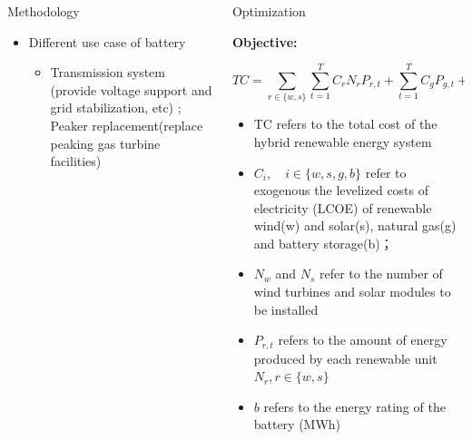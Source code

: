 \documentclass[final]{beamer}
\newlength{\onecolwid}
\newlength{\twocolwid}
\begin{document}
\begin{frame}[t]
\begin{columns}[t]
\begin{column}{\twocolwid}
\begin{columns}[t,totalwidth=\twocolwid]
\begin{column}{\onecolwid}
\begin{block}{Methodology}
\begin{itemize}
		\begin{itemize}
			\item \$0/t $CO_2$;  \$20/t $CO_2$ ;   \$30/t $CO_2$
		\end{itemize}
		
		\item Different use case of battery
		
		\begin{itemize}
			\item Transmission system (provide voltage support and grid stabilization, etc) ; Peaker replacement(replace peaking gas turbine facilities)
		\end{itemize}
	\end{itemize}
	
	
\end{block}





\end{column} %

\begin{column}{\onecolwid}\vspace{-.6in} %



\begin{block}{Optimization}

\textbf{Objective:}

\begin{equation}
TC = \sum_{r \in \{w,s\}} \sum_{t=1}^{T} C_r N_r P_{r,t} +  \sum_{t=1}^{T} C_g P_{g,t} + C_b \times K_b
\label{eqn:objective}
\end{equation}

\begin{itemize}
	\item TC refers to the total cost of the hybrid renewable energy system
	\item $C_i, \quad i \in \{w, s, g, b\}$ refer to exogenous the levelized costs of electricity (LCOE) of renewable wind(w) and solar(s), natural gas(g) and battery storage(b)； 
	\item $N_w$ and $N_s$ refer to the number of wind turbines and solar modules to be installed
	\item $P_{r,t}$ refers to the amount of energy produced by each renewable unit $N_r, r \in \{w, s\}$
	\item $b$ refers to the energy rating of the battery (MWh)


\end{itemize}
\end{block}
\end{column}
\end{columns}
\end{column}
\end{columns}
\end{frame}
\end{document}
